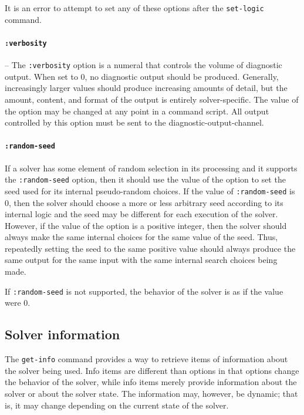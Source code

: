 \documentclass[12pt,oneside]{report}
\begin{document}
It is an error to attempt to set any of these options after the {\tt set-logic} command.

\paragraph{\tt :verbosity} -- 
The {\tt :verbosity} option is a numeral that controls the volume of diagnostic output.  When set to 0, no
diagnostic output should be produced.  Generally, increasingly larger values should produce
increasing amounts of detail, but the amount, content, and format of the output is entirely
solver-specific.
The value of the option may be changed at any point in a command script.  All output controlled by
this option must be sent to the diagnostic-output-channel.


\paragraph{\tt :random-seed}

If a solver has some element of random selection in its processing and it supports 
the {\tt :random-seed} option, then it should use the value of the option to set the seed used
for its internal pseudo-random choices.  If the value of {\tt :random-seed} is 0, then the 
solver should choose a more or less arbitrary seed according to its internal logic and the
seed may be different for each execution of the solver. However, if
the value of the option is a positive integer, then the solver should always make the same
internal choices for the same value of the seed. Thus, repeatedly setting the seed to the same
positive value should always produce the same output for the same input with the same internal search choices being made.

If {\tt :random-seed} is not supported, the behavior of the solver is as if the value were 0.

\subsection{Solver information}
\label{InfoItems}

The {\tt get-info} command provides a way to retrieve items of information about the solver being used.  Info items are different than options in that options change the behavior of 
the solver, while info items merely provide information about the solver or about the 
solver state.  The information may, however, be dynamic; that is, it may change depending on the current state of the solver.
\end{document}
